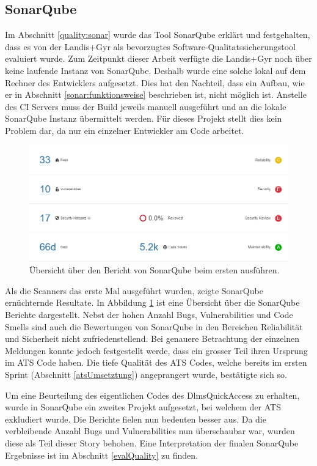 \subsection{SonarQube}\label{s6:sonar}
Im Abschnitt \ref{quality:sonar} wurde das Tool SonarQube erklärt und festgehalten, dass es von der Landis+Gyr als bevorzugtes Software-Qualitatssicherungstool evaluiert wurde.
Zum Zeitpunkt dieser Arbeit verfügte die Landis+Gyr noch über keine laufende Instanz von SonarQube.
Deshalb wurde eine solche lokal auf dem Rechner des Entwicklers aufgesetzt.
Dies hat den Nachteil, dass ein Aufbau, wie er in Abschnitt \ref{sonar:funktionsweise} beschrieben ist, nicht möglich ist.
Anstelle des \ac{CI} Servers muss der Build jeweils manuell ausgeführt und an die lokale SonarQube Instanz übermittelt werden.
Für dieses Projekt stellt dies kein Problem dar, da nur ein einzelner Entwickler am Code arbeitet.

\begin{figure}[H]
   \centering
   \includegraphics[width=1.0\textwidth]{gfx/SonarQubeOverallWithATS.png}
   \caption{
      Übersicht über den Bericht von SonarQube beim ersten ausführen.
   }
   \label{fig:sonarFistRunWithAts}
\end{figure}

Als die Scanners das erste Mal ausgeführt wurden, zeigte SonarQube ernüchternde Resultate.
In Abbildung \ref{fig:sonarFistRunWithAts} ist eine Übersicht über die SonarQube Berichte dargestellt.
Nebst der hohen Anzahl Bugs, Vulnerabilities und Code Smells sind auch die Bewertungen von SonarQube in den Bereichen Reliabilität und Sicherheit nicht zufriedenstellend.
Bei genauere Betrachtung der einzelnen Meldungen konnte jedoch festgestellt werde, dass ein grosser Teil ihren Ursprung im \ac{ATS} Code haben.
Die tiefe Qualität des \ac{ATS} Codes, welche bereits im ersten Sprint (Abschnitt \ref{atsUmsetztung}) angeprangert wurde, bestätigte sich so.

Um eine Beurteilung des eigentlichen Codes des DlmsQuickAccess zu erhalten, wurde in SonarQube ein zweites Projekt aufgesetzt, bei welchem der \ac{ATS} exkludiert wurde.
Die Berichte fielen nun bedeuten besser aus.
Da die verbleibende Anzahl Bugs und Vulnerabilities nun überschaubar war, wurden diese als Teil dieser Story behoben.
Eine Interpretation der finalen SonarQube Ergebnisse ist im Abschnitt \ref{evalQuality} zu finden.


